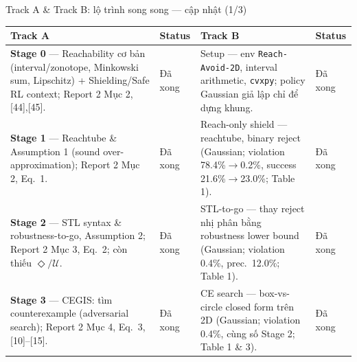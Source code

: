 \documentclass[aspectratio=169]{beamer}
\newcommand{\good}[1]{\textcolor{green!40!black}{#1}}
\begin{document}
\begin{frame}[t,shrink=8]{Track A \& Track B: lộ trình song song --- cập nhật (1/3)}
\footnotesize
\begin{tabularx}{\textwidth}{|>{\raggedright\arraybackslash}p{}|>{\centering\arraybackslash}p{}|>{\raggedright\arraybackslash}p{}|>{\centering\arraybackslash}p{}|}
\hline
\textbf{Track A} & \textbf{Status} & \textbf{Track B} & \textbf{Status} \\
\hline
\textbf{Stage 0} --- Reachability cơ bản (interval/zonotope, Minkowski sum, Lipschitz) + Shielding/Safe RL context; Report 2 Mục 2, [44],[45]. &
\good{Đã xong} &
Setup --- env \texttt{Reach-Avoid-2D}, interval arithmetic, \texttt{cvxpy}; policy Gaussian giả lập chỉ để dựng khung. &
\good{Đã xong} \\
\hline
\textbf{Stage 1} --- Reachtube \& Assumption 1 (sound over-approximation); Report 2 Mục 2, Eq.~1. &
\good{Đã xong} &
Reach-only shield --- reachtube, binary reject (Gaussian; violation 78.4\%$\to$0.2\%, success 21.6\%$\to$23.0\%; Table 1). &
\good{Đã xong} \\
\hline
\textbf{Stage 2} --- STL syntax \& robustness-to-go, Assumption 2; Report 2 Mục 3, Eq.~2; còn thiếu $\Diamond/\mathcal U$. &
\good{Đã xong} &
STL-to-go --- thay reject nhị phân bằng robustness lower bound (Gaussian; violation 0.4\%, prec.~12.0\%; Table 1). &
\good{Đã xong} \\
\hline
\textbf{Stage 3} --- CEGIS: tìm counterexample (adversarial search); Report 2 Mục 4, Eq.~3, [10]--[15]. &
\good{Đã xong} &
CE search --- box-vs-circle closed form trên 2D (Gaussian; violation 0.4\%, cùng số Stage 2; Table 1 \& 3). &
\good{Đã xong} \\
\hline
\end{tabularx}
\end{frame}
\end{document}
